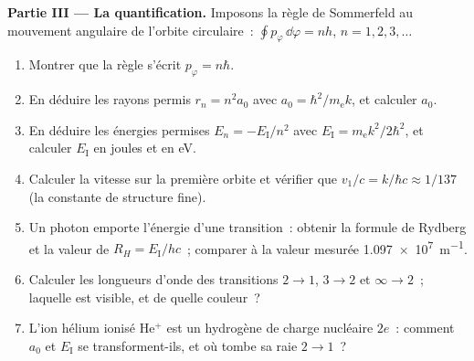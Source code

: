 \begin{problem}
\medskip\noindent\textbf{Partie III --- La quantification.}
Imposons la règle de Sommerfeld au mouvement angulaire de l'orbite
circulaire~: $\oint p_\varphi\,\dd\varphi = nh$, $n = 1, 2, 3, \dots$
\begin{enumerate}[resume]
  \item Montrer que la règle s'écrit $p_\varphi = n\hbar$.
  \item En déduire les rayons permis $r_n = n^2a_0$ avec $a_0 =
        \hbar^2/m_{\text{e}}k$, et calculer $a_0$.
  \item En déduire les énergies permises $E_n = -E_{\text{I}}/n^2$
        avec $E_{\text{I}} = m_{\text{e}}k^2/2\hbar^2$, et calculer
        $E_{\text{I}}$ en joules et en eV.
  \item Calculer la vitesse sur la première orbite et vérifier que $v_1/c =
        k/\hbar c \approx 1/137$ (la constante de structure fine).
  \item Un photon emporte l'énergie d'une transition~: obtenir la
        formule de Rydberg et la valeur de $R_H = E_{\text{I}}/hc$~;
        comparer à la valeur mesurée \qty{1.097e7}{m^{-1}}.
  \item Calculer les longueurs d'onde des transitions $2 \to 1$,
        $3 \to 2$ et $\infty \to 2$~; laquelle est visible, et de
        quelle couleur~?
  \item L'ion hélium ionisé He$^+$ est un hydrogène de charge nucléaire
        $2e$~: comment $a_0$ et $E_{\text{I}}$ se transforment-ils, et
        où tombe sa raie $2 \to 1$~?
\end{enumerate}


\end{problem}
